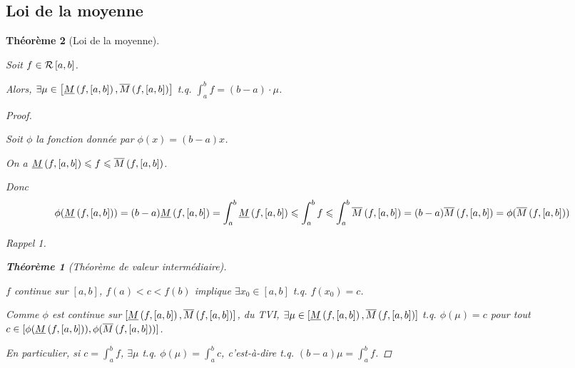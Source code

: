 \documentclass{report}
\newcommand*{\dint}[3]{\displaystyle\int_{#1}^{#2}#3}
\newcommand*{\lte}{\leqslant}
\newtheorem*{thm}{Th\'eor\`eme}
\theoremstyle{definition}
\theoremstyle{remark}
\newtheorem*{rapp}{Rappel}
\begin{document}
	\subsection{Loi de la moyenne}
	\begin{thm}[Loi de la moyenne]~

		Soit $f \in \riemann$.

		Alors, $\exists\mu \in \left[ \minf{f}[a,b], \msup{f}[a,b] \right]$ t.q. $\dint{a}{b}{f} = (b-a) \cdot \mu$.
		\begin{proof}~

			Soit $\phi$ la fonction donn\'ee par $\phi(x)=(b-a)x$.

			On a $\minf{f} \lte f \lte \msup{f}$.

			Donc
			\[
			\phi(\minf{f}) = (b-a)\minf{f} = \dint{a}{b}{\minf{f}} \lte \dint{a}{b}{f} \lte \dint{a}{b}{\msup{f}} = (b-a)\msup{f} = \phi(\msup{f})
			\]
			\begin{rapp}
				\begin{thm}[Th\'eor\`eme de valeur interm\'ediaire]~

					$f$ continue sur $[a,b]$, $f(a)<c<f(b)$ implique $\exists x_0 \in [a,b]$ t.q. $f(x_0)=c$.
				\end{thm}
			\end{rapp}

			Comme $\phi$ est continue sur $[\minf{f},\msup{f}]$, du TVI, $\exists\mu\in[\minf{f},\msup{f}]$ t.q. $\phi(\mu)=c$ pour tout $c \in [\phi(\minf{f}),\phi(\msup{f})]$.

			En particulier, si $c=\dint{a}{b}{f}$, $\exists\mu$ t.q. $\phi(\mu)=\dint{a}{b}{c}$, c'est-\`a-dire t.q. $(b-a)\mu=\dint{a}{b}{f}$.
		\end{proof}
	\end{thm}
\end{document}
